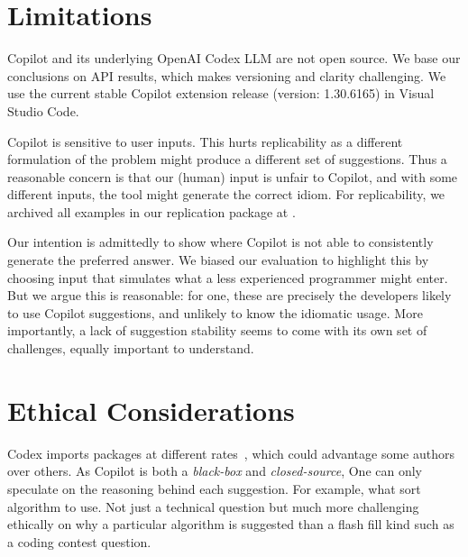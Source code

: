 \section{Limitations}
\label{limitations}
Copilot and its underlying OpenAI Codex LLM are not open source. 
We base our conclusions on API results, which makes versioning and clarity challenging. We use the current stable Copilot extension release (version: 1.30.6165) in Visual Studio Code. %

Copilot is sensitive to user inputs. This hurts replicability as a different formulation of the problem might produce a different set of suggestions. 
Thus a reasonable concern is that our (human) input is unfair to Copilot, and with some different inputs, the tool might generate the correct idiom. 
For replicability, we archived all examples in our replication package at \repl{}.

Our intention is admittedly to show where Copilot is not able to consistently generate the preferred answer. We biased our evaluation to highlight this by choosing input that simulates what a less experienced programmer might enter. 
But we argue this is reasonable: for one, these are precisely the developers likely to use Copilot suggestions, and unlikely to know the idiomatic usage.
More importantly, a lack of suggestion stability seems to come with its own set of challenges, equally important to understand.%
%

\section{Ethical Considerations}
\label{ethics}
Codex imports packages at different rates~\cite{copilot}, which could advantage some authors over others. As Copilot is both a \emph{black-box} and \emph{closed-source}, One can only speculate on the reasoning behind each suggestion.  For example, what sort algorithm to use. Not just a technical question but much more challenging ethically on why a particular algorithm is suggested than a flash fill kind such as a coding contest question.